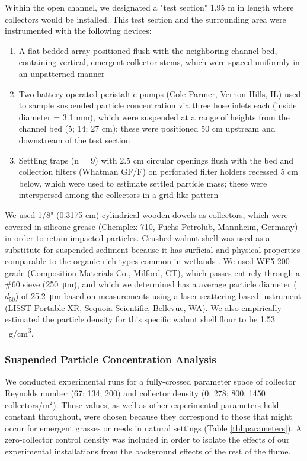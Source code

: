 \documentclass[geosciences,article,submit,moreauthors,pdftex]{Definitions/mdpi}
\begin{document}
Within the open channel, we designated a "test section" 1.95 m in length where collectors would be installed. This test section and the surrounding area were instrumented with the following devices:
\begin{enumerate}
     \item A flat-bedded array positioned flush with the neighboring channel bed, containing vertical, emergent collector stems, which were spaced uniformly in an unpatterned manner
    \item Two battery-operated peristaltic pumps (Cole-Parmer, Vernon Hills, IL) used to sample suspended particle concentration via three hose inlets each (inside diameter = 3.1 mm), which were suspended at a range of heights from the channel bed (5; 14; 27 cm); these were positioned 50 cm upstream and downstream of the test section 
   \item Settling traps (n = 9) with 2.5 cm circular openings flush with the bed and collection filters (Whatman GF/F) on perforated filter holders recessed 5 cm below, which were used to estimate settled particle mass; these were interspersed among the collectors in a grid-like pattern
\end{enumerate}

We used 1/8" (0.3175 cm) cylindrical wooden dowels as collectors, which were covered in silicone grease (Chemplex 710, Fuchs Petrolub, Mannheim, Germany) in order to retain impacted particles. Crushed walnut shell was used as a substitute for suspended sediment because it has surficial and physical properties comparable to the organic-rich types common in wetlands \cite{muller2017experiments, jenzer2015sediment, redding2006particle}. We used WF5-200 grade (Composition Materials Co., Milford, CT), which passes entirely through a \#60 sieve (\SI{250}{\micro\metre}), and which we determined has a average particle diameter ($d_{50}$) of \SI{25.2}{\micro\metre} based on measurements using a laser-scattering-based instrument (LISST-Portable|XR, Sequoia Scientific, Bellevue, WA). We also empirically estimated the particle density for this specific walnut shell flour to be 1.53 \SI{}{\gram/\centi\metre\cubed}.

\subsubsection{Suspended Particle Concentration Analysis}

We conducted experimental runs for a fully-crossed parameter space of collector Reynolds number (67; 134; 200) and collector density (0; 278; 800; 1450 collectors/m$^2$). These values, as well as other experimental parameters held constant throughout, were chosen because they correspond to those that might occur for emergent grasses or reeds in natural settings (Table \ref{tbl:parameters}). A zero-collector control density was included in order to isolate the effects of our experimental installations from the background effects of the rest of the flume.   
\end{document}
